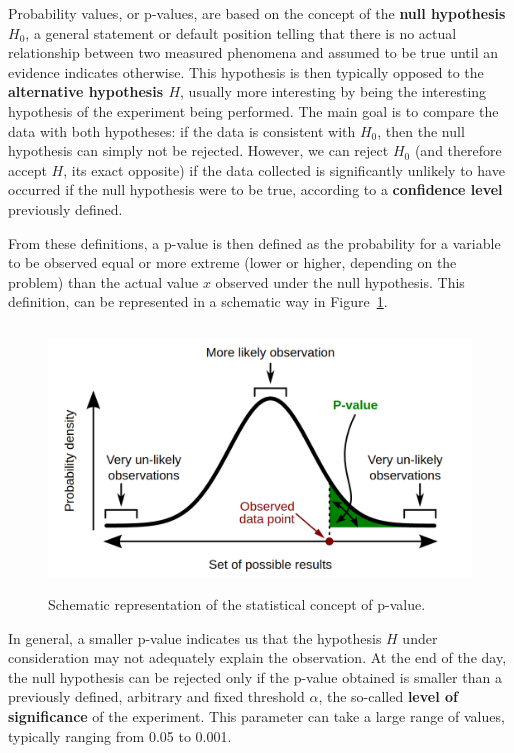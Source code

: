 \documentclass[a4paper, 11pt]{report}
\begin{document}
Probability values, or p-values, are based on the concept of the \textbf{null hypothesis $H_0$}, a general statement or default position telling that there is no actual relationship between two measured phenomena and assumed to be true until an evidence indicates otherwise. This hypothesis is then typically opposed to the \textbf{alternative hypothesis $H$}, usually more interesting by being the interesting hypothesis of the experiment being performed. The main goal is to compare the data with both hypotheses: if the data is consistent with $H_0$, then the null hypothesis can simply not be rejected. However, we can reject $H_0$ (and therefore accept $H$, its exact opposite) if the data collected is significantly unlikely to have occurred if the null hypothesis were to be true, according to a \textbf{confidence level} previously defined.

From these definitions, a p-value is then defined as the probability for a variable to be observed equal or more extreme (lower or higher, depending on the problem) than the actual value $x$ observed under the null hypothesis. This definition, can be represented in a schematic way in Figure~\ref{fig:pvalue}.

\begin{figure}[htbp]
\centering
\includegraphics[width=13cm, height=7cm]{figs/pvalue.png}
\caption{Schematic representation of the statistical concept of p-value.}
\label{fig:pvalue}
\end{figure}

In general, a smaller p-value indicates us that the hypothesis $H$ under consideration may not adequately explain the observation. At the end of the day, the null hypothesis can be rejected only if the p-value obtained is smaller than a previously defined, arbitrary and fixed threshold $\alpha$, the so-called \textbf{level of significance} of the experiment. This parameter can take a large range of values, typically ranging from 0.05 to 0.001.
\end{document}
